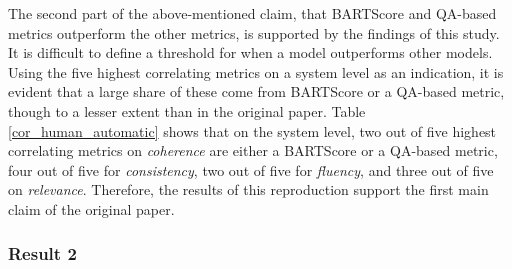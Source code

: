 The second part of the above-mentioned claim, that BARTScore and QA-based metrics outperform the other metrics, is supported by the findings of this study. It is difficult to define a threshold for when a model outperforms other models. Using the five highest correlating metrics on a system level as an indication, it is evident that a large share of these come from BARTScore or a QA-based metric, though to a lesser extent than in the original paper. Table \ref{cor_human_automatic} shows that on the system level, two out of five highest correlating metrics on \textit{coherence} are either a BARTScore or a QA-based metric, four out of five for \textit{consistency}, two out of five for \textit{fluency}, and three out of five on \textit{relevance}. Therefore, the results of this reproduction support the first main claim of the original paper.  



\subsubsection{Result 2} %

